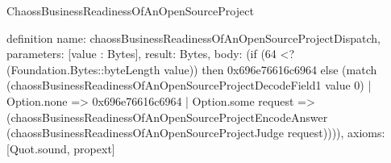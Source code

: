 \begin{lexlean}{ChaossBusinessReadinessOfAnOpenSourceProject}
\begin{semanticmodule}
definition{
  name: chaossBusinessReadinessOfAnOpenSourceProjectDispatch,
  parameters: [value : Bytes],
  result: Bytes,
  body: (if (64 <? (Foundation.Bytes::byteLength value)) then 0x696e76616c6964 else (match (chaossBusinessReadinessOfAnOpenSourceProjectDecodeField1 value 0)
    | Option.none => 0x696e76616c6964
    | Option.some request => (chaossBusinessReadinessOfAnOpenSourceProjectEncodeAnswer (chaossBusinessReadinessOfAnOpenSourceProjectJudge request)))),
  axioms: [Quot.sound, propext]
}
\end{semanticmodule}
\end{lexlean}
